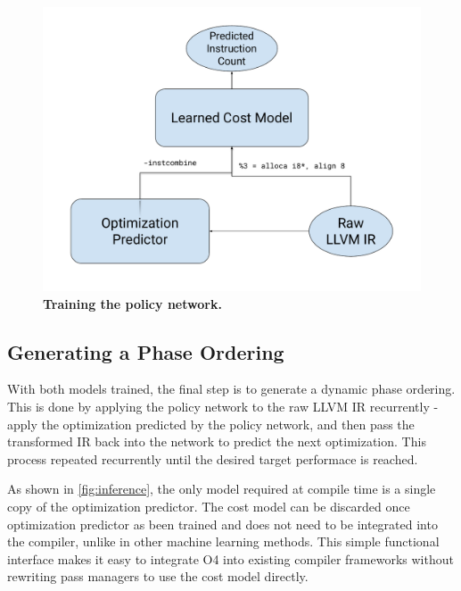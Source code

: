 \documentclass[conference]{IEEEtran}
\begin{document}
\label{fig:training_policy_network}
\begin{figure}
  \centering
  \includegraphics[scale=0.3]{figures/training_2.pdf}
  \caption{\textbf{Training the policy network.}}
\end{figure}

\subsection{Generating a Phase Ordering}

With both models trained, the final step is to generate a dynamic phase
ordering. This is done by applying the policy network to the raw LLVM IR
recurrently - apply the optimization predicted by the policy network, and then
pass the transformed IR back into the network to predict the next optimization.
This process repeated recurrently until the desired target performace is
reached.

As shown in \ref{fig:inference}, the only model required at compile time is a
single copy of the optimization predictor. The cost model can be discarded once
optimization predictor as been trained and does not need to be integrated into
the compiler, unlike in other machine learning methods. This simple functional
interface makes it easy to integrate O4 into existing compiler frameworks
without rewriting pass managers to use the cost model directly.
\end{document}
